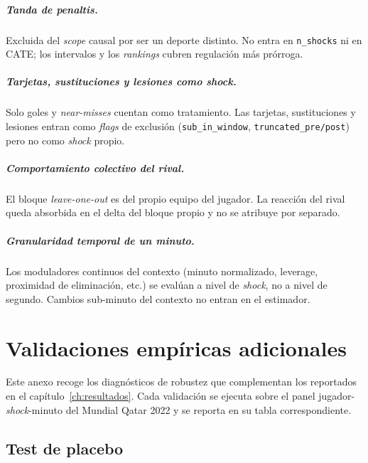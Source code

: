 \paragraph{Tanda de penaltis.}
Excluida del \textit{scope} causal por ser un deporte distinto. No
entra en \texttt{n\_shocks} ni en CATE; los intervalos y los
\textit{rankings} cubren regulación más prórroga.

\paragraph{Tarjetas, sustituciones y lesiones como \textit{shock}.}
Solo goles y \textit{near-misses} cuentan como tratamiento. Las
tarjetas, sustituciones y lesiones entran como \textit{flags} de
exclusión (\texttt{sub\_in\_window}, \texttt{truncated\_pre/post})
pero no como \textit{shock} propio.

\paragraph{Comportamiento colectivo del rival.}
El bloque \textit{leave-one-out} es del propio equipo del jugador.
La reacción del rival queda absorbida en el delta del bloque propio
y no se atribuye por separado.

\paragraph{Granularidad temporal de un minuto.}
Los moduladores continuos del contexto (minuto normalizado, leverage,
proximidad de eliminación, etc.) se evalúan a nivel de \textit{shock},
no a nivel de segundo. Cambios sub-minuto del contexto no entran en
el estimador.


\chapter{Validaciones empíricas adicionales}
\label{anexo:validaciones}

Este anexo recoge los diagnósticos de robustez que complementan los
reportados en el capítulo~\ref{ch:resultados}. Cada validación se
ejecuta sobre el panel jugador-\textit{shock}-minuto del Mundial
Qatar 2022 y se reporta en su tabla correspondiente.

\section{Test de placebo}
\label{anexo:val-placebo}

